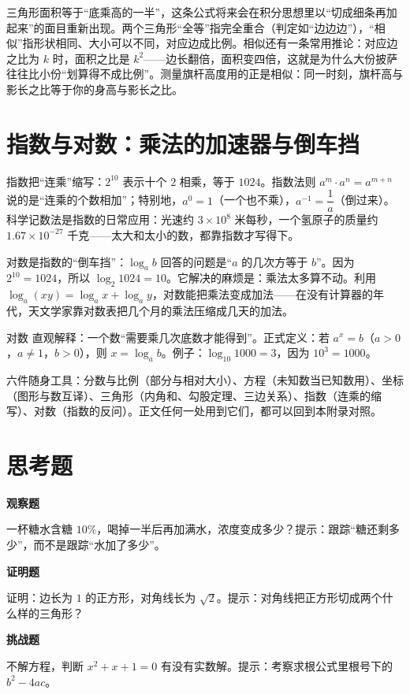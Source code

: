 三角形面积等于“底乘高的一半”，这条公式将来会在积分思想里以“切成细条再加起来”的面目重新出现。两个三角形“全等”指完全重合（判定如“边边边”），“相似”指形状相同、大小可以不同，对应边成比例。相似还有一条常用推论：对应边之比为 $k$ 时，面积之比是 $k^2$——边长翻倍，面积变四倍，这就是为什么大份披萨往往比小份“划算得不成比例”。测量旗杆高度用的正是相似：同一时刻，旗杆高与影长之比等于你的身高与影长之比。

\section{指数与对数：乘法的加速器与倒车挡}

指数把“连乘”缩写：$2^{10}$ 表示十个 $2$ 相乘，等于 $1024$。指数法则 $a^m\cdot a^n=a^{m+n}$ 说的是“连乘的个数相加”；特别地，$a^0=1$（一个也不乘），$a^{-1}=\dfrac{1}{a}$（倒过来）。科学记数法是指数的日常应用：光速约 $3\times10^{8}$ 米每秒，一个氢原子的质量约 $1.67\times10^{-27}$ 千克——太大和太小的数，都靠指数才写得下。

对数是指数的“倒车挡”：$\log_a b$ 回答的问题是“$a$ 的几次方等于 $b$”。因为 $2^{10}=1024$，所以 $\log_2 1024=10$。它解决的麻烦是：乘法太多算不动。利用 $\log_a(xy)=\log_a x+\log_a y$，对数能把乘法变成加法——在没有计算器的年代，天文学家靠对数表把几个月的乘法压缩成几天的加法。

\begin{shuyu}{对数}
直观解释：一个数“需要乘几次底数才能得到”。正式定义：若 $a^x=b$（$a>0$，$a\neq1$，$b>0$），则 $x=\log_a b$。例子：$\log_{10}1000=3$，因为 $10^3=1000$。
\end{shuyu}

\begin{toolbox}
六件随身工具：分数与比例（部分与相对大小）、方程（未知数当已知数用）、坐标（图形与数互译）、三角形（内角和、勾股定理、三边关系）、指数（连乘的缩写）、对数（指数的反问）。正文任何一处用到它们，都可以回到本附录对照。
\end{toolbox}

\section*{思考题}

\textbf{观察题}
\begin{sikao}
\item 一杯糖水含糖 $10\%$，喝掉一半后再加满水，浓度变成多少？提示：跟踪“糖还剩多少”，而不是跟踪“水加了多少”。
\end{sikao}

\textbf{证明题}
\begin{sikao}
\item 证明：边长为 $1$ 的正方形，对角线长为 $\sqrt{2}$。提示：对角线把正方形切成两个什么样的三角形？
\end{sikao}

\textbf{挑战题}
\begin{sikao}
\item 不解方程，判断 $x^2+x+1=0$ 有没有实数解。提示：考察求根公式里根号下的 $b^2-4ac$。
\end{sikao}
